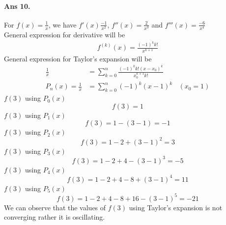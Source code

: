 \documentclass[12pt]{report}
\begin{document}
\paragraph*{Ans 10.} For $f(x) = \frac{1}{x}$, we have $f'(x) \frac{-1}{x^2}$, $f''(x) = \frac{2}{x^3}$ and $f'''(x) = \frac{-6}{x^4}$\\
General expression for derivative will be
\begin{align*}
    f^{(k)}(x) = \frac{(-1)^k k!}{x^{k+1}}
\end{align*}
General expression for Taylor's expansion will be
\begin{align*}
    \frac{1}{x} &= \sum\limits_{k=0}^{n}\frac{(-1)^k k!(x-x_0)^k}{x_0^{k+1}k!}\\
    P_n(x) = \frac{1}{x} &= \sum\limits_{k=0}^{n}(-1)^k (x-1)^k~~~~ (x_0 = 1)
\end{align*}
$f(3)$ using $P_0(x)$
$$ f(3) = 1$$
$f(3)$ using $P_1(x)$
$$ f(3) = 1 - (3 - 1) = -1$$
$f(3)$ using $P_2(x)$
$$ f(3) = 1 - 2 + (3 - 1)^2 = 3$$
$f(3)$ using $P_3(x)$
$$ f(3) = 1-2+4-(3-1)^3 = -5$$
$f(3)$ using $P_4(x)$
$$ f(3) = 1-2+4-8+(3-1)^4 = 11$$
$f(3)$ using $P_5(x)$
$$ f(3) = 1-2+4-8+16-(3-1)^5 = -21$$
We can observe that the values of $f(3)$ using Taylor's expansion is not converging rather it is oscillating. 
\end{document}
